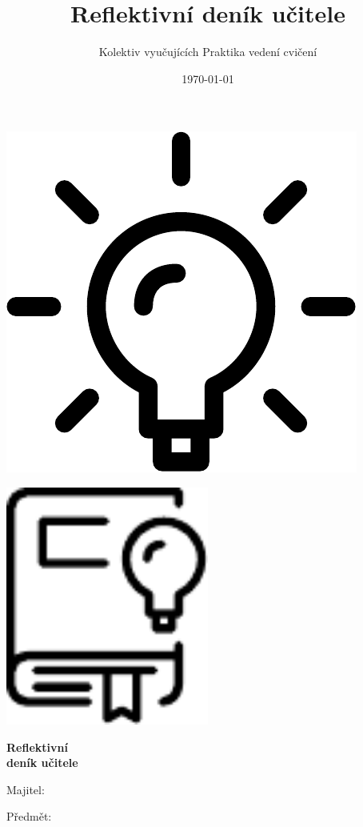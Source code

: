 \documentclass[twoside,openany]{book}
\title{Reflektivní deník učitele}
\author{Kolektiv vyučujících Praktika vedení cvičení}
\date{\today}
\begin{document}
\begin{titlepage}
	\vspace*{0.14\paperheight}
	\centering
	\includegraphics[width=0.7\paperwidth]{../img/lightbulb}
	\newpage
\end{titlepage}
\begin{titlepage}
	\centering
	\vspace*{1cm}
	\includegraphics[width=0.5\textwidth]{../img/diary}\par
	\vspace{0.5cm}
	{\huge\bfseries Reflektivní\\ deník učitele\par}
	\vfill
	\raggedright
	\Large
	Majitel:\par
	\vspace{0.2cm}
	Předmět:\par
\end{titlepage}
\end{document}

